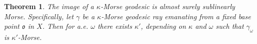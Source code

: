 \documentclass[12 pt]{amsart}
\newcommand{\gothic}{\mathfrak}
\newcommand{\go}{{\gothic o}}
\newtheorem{theorem}{Theorem}[section]
\newtheorem{proposition}[theorem]{Proposition}
\theoremstyle{definition}
\theoremstyle{remark}
\begin{document}
\begin{theorem} \label{37}
The image of a $\kappa$-Morse geodesic is almost surely sublinearly Morse. Specifically, let $\gamma$ be a $\kappa$-Morse geodesic ray emanating from a fixed base point $\go$ in $X$. Then for a.e. $\omega$ there exists $\kappa'$, depending on $\kappa$ and $\omega$ such that $\gamma_\omega$ is $\kappa'$-Morse.
\end{theorem}
\end{document}
